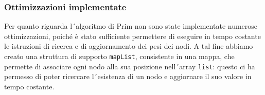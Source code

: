 \subsubsection{Ottimizzazioni implementate}
Per quanto riguarda l´algoritmo di Prim non sono state implementate numerose ottimizzazioni, poiché è stato sufficiente
permettere di eseguire in tempo costante le istruzioni di ricerca e di aggiornamento dei pesi dei nodi. A tal fine abbiamo creato
una struttura di supporto \texttt{mapList}, consistente in una mappa, che permette di associare ogni nodo alla sua posizione nell´array
\texttt{list}: questo ci ha permesso di poter ricercare l´esistenza di un nodo e aggiornare il suo valore in tempo costante.